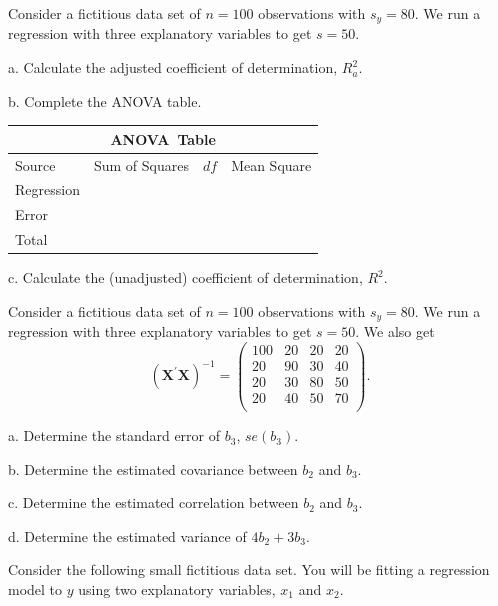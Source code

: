 \begin{exercises}


\item  Consider a fictitious data set of $n = 100$ observations with
$s_y = 80$. We run a regression with three explanatory variables to
get $s = 50$.

a.  Calculate the adjusted coefficient of determination, $R_a^2$.

b. Complete the ANOVA table.

\begin{center}
\begin{tabular}{l|lcl}
\hline \multicolumn{4}{c}{ANOVA\ Table} \\ \hline Source & Sum of
Squares & $df$ & Mean Square \\ \hline
Regression & &  & \\
Error &  &  &  \\
Total &  &  &  \\ \hline
\end{tabular}
\end{center}

c.  Calculate the (unadjusted) coefficient of determination, $R^2$.

\item  Consider a fictitious data set of $n = 100$
observations with $s_y = 80$. We run a regression with three
explanatory variables to get $s = 50$. We also get
\begin{equation*}
\left(\mathbf{X^{\prime} X} \right)^{-1} = \left(
\begin{array}{cccc}
100 & 20 &20 & 20\\
20 & 90 & 30 & 40 \\
20 & 30 & 80 & 50 \\
20 & 40 & 50 & 70 \\
\end{array}
\right).
\end{equation*}

a. Determine the standard error of $b_3$, $se(b_3)$.

b. Determine the estimated covariance between $b_2$ and $b_3$.

c. Determine the estimated correlation between $b_2$ and $b_3$.

d. Determine the estimated variance of $4b_2 + 3b_3$.

\item Consider the following small fictitious data set. You will be
fitting a regression model to $y$ using two explanatory variables,
$x_1$ and $x_2$.


\end{exercises}
